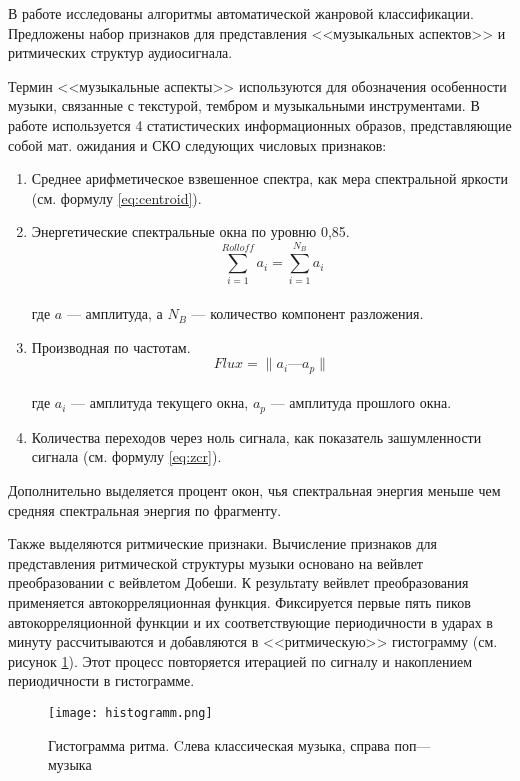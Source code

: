 В работе\cite{src1} исследованы алгоритмы автоматической жанровой классификации. Предложены набор признаков для представления <<музыкальных аспектов>> и ритмических структур аудиосигнала. 

Термин <<музыкальные аспекты>> используются для обозначения особенности музыки, связанные с текстурой, тембром и музыкальными инструментами. В работе используется 4 статистических информационных образов, представляющие собой мат. ожидания и СКО следующих числовых признаков:

\begin{enumerate}[label=\arabic*.]
\item Среднее арифметическое взвешенное спектра, как мера спектральной яркости (см. формулу \ref{eq:centroid}).
\item Энергетические спектральные окна по уровню 0,85.
\begin{equation}\label{eq:rolloff}
 \sum\limits_{i=1}^{Rolloff} a_i =  \sum\limits_{i=1}^{N_B} a_i
\end{equation}  \\
где $ a $ — амплитуда,  а $N_B$ — количество компонент разложения.
\item Производная по частотам.
\begin{equation}\label{eq:flux}
Flux = \lVert a_i — a_p \rVert
\end{equation}  \\
где $a_i$ — амплитуда текущего окна, $a_p$ — амплитуда прошлого окна.
\item Количества переходов через ноль сигнала, как показатель зашумленности сигнала (см. формулу \ref{eq:zcr}).
\end{enumerate}

Дополнительно выделяется процент окон, чья спектральная энергия меньше чем средняя спектральная энергия по фрагменту.

Также выделяются ритмические признаки. Вычисление признаков для представления ритмической структуры музыки основано на вейвлет преобразовании с вейвлетом Добеши. К результату вейвлет преобразования применяется автокорреляционная функция. Фиксируется первые пять пиков автокорреляционной функции и их соответствующие периодичности в ударах в минуту рассчитываются и добавляются в <<ритмическую>> гистограмму (см. рисунок \ref{fig:domain:histogramm}). Этот процесс повторяется итерацией по сигналу и накоплением периодичности в гистограмме. 

\begin{figure}[ht]
\centering
  \texttt{[image: histogramm.png]}
  \caption{Гистограмма ритма. Cлева классическая музыка, справа поп—музыка}
  \label{fig:domain:histogramm}
\end{figure}

